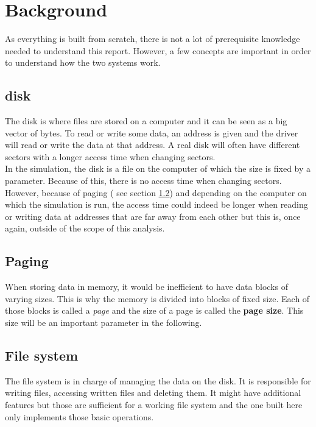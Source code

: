 \documentclass[10pt,a4paper]{ULBreport}
\begin{document}
\chapter{Background}

As everything is built from scratch, there is not a lot of prerequisite knowledge needed to understand this report. However, a few concepts are important in order to understand how the two systems work.

\section{disk}
\label{sec:disk}

The disk is where files are stored on a computer and it can be seen as a big vector of bytes. To read or write some data, an address is given and the driver will read or write the data at that address. A real disk will often have different sectors with a longer access time when changing sectors. \\

In the simulation, the disk is a file on the computer of which the size is fixed by a parameter. Because of this, there is no access time when changing sectors. However, because of paging ( see section \ref{sec:paging}) and depending on the computer on which the simulation is run, the access time could indeed be longer when reading or writing data at addresses that are far away from each other but this is, once again, outside of the scope of this analysis. \\

\section{Paging}
\label{sec:paging}

When storing data in memory, it would be inefficient to have data blocks of varying sizes. This is why the memory is divided into blocks of fixed size. Each of those blocks is called a \textit{page} and the size of a page is called the \textbf{page size}. This size will be an important parameter in the following.

\section{File system}
\label{sec:filesystem}

The file system is in charge of managing the data on the disk. It is responsible for writing files, accessing written files and deleting them. It might have additional features but those are sufficient for a working file system and the one built here only implements those basic operations.
\end{document}
